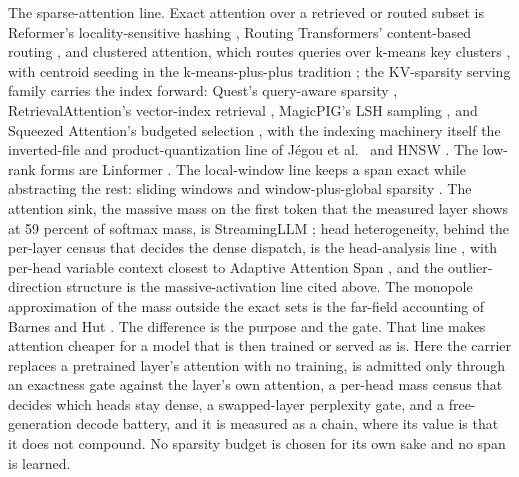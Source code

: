\documentclass[11pt]{article}
\begin{document}
The sparse-attention line. Exact attention over a retrieved or
routed subset is Reformer's locality-sensitive hashing
\cite{kitaev2020}, Routing Transformers' content-based
routing \cite{roy2021}, and clustered attention, which routes
queries over k-means key clusters \cite{vyas2020clustered},
with centroid seeding in the k-means-plus-plus tradition
\cite{arthur2007}; the KV-sparsity serving family carries
the index forward: Quest's query-aware sparsity
\cite{quest2025}, RetrievalAttention's vector-index retrieval
\cite{retrievalattention2024}, MagicPIG's LSH sampling
\cite{magicpig2024}, and Squeezed Attention's budgeted
selection \cite{squeezed2025}, with the indexing machinery
itself the inverted-file and product-quantization line of
J\'egou et al.~\cite{jegou2011} and HNSW \cite{malkov2018}.
The low-rank forms are Linformer \cite{linformer2020}. The
local-window line keeps a span exact while abstracting the
rest: sliding windows \cite{beltagy2020} and window-plus-global
sparsity \cite{zaheer2020}. The
attention sink, the massive mass on the first token that the
measured layer shows at 59 percent of softmax mass, is
StreamingLLM \cite{xiao2023}; head heterogeneity, behind the
per-layer census that decides the dense dispatch, is the
head-analysis line \cite{clark2019, voita2019}, with per-head
variable context closest to Adaptive Attention Span
\cite{sukhbaatar2019}, and the outlier-direction structure is
the massive-activation line cited above. The monopole
approximation of the mass outside the exact sets is the
far-field accounting of Barnes and Hut \cite{barnes1986}. The
difference is the purpose and the gate. That line makes
attention cheaper for a model that is then trained or served as
is. Here the carrier replaces a pretrained layer's attention with
no training, is admitted only through an exactness gate against
the layer's own attention, a per-head mass census that decides
which heads stay dense, a swapped-layer perplexity gate, and a
free-generation decode battery, and it is measured as a chain,
where its value is that it does not compound. No sparsity budget
is chosen for its own sake and no span is learned.
\end{document}
